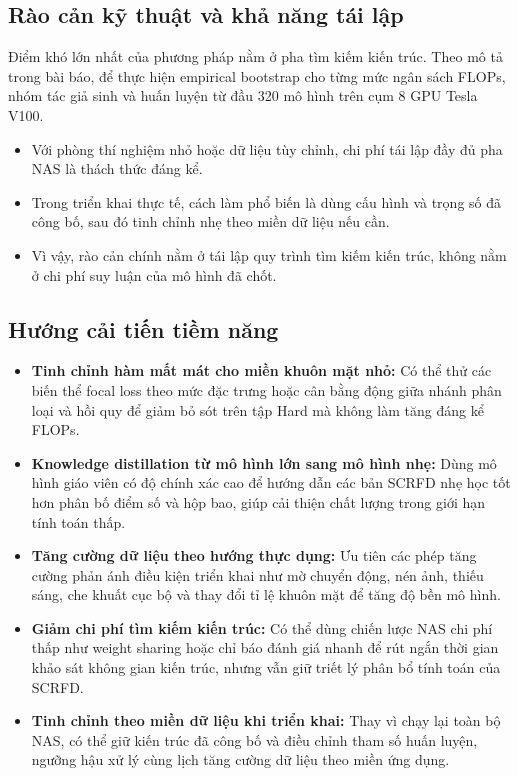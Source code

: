 \subsection{Rào cản kỹ thuật và khả năng tái lập}

Điểm khó lớn nhất của phương pháp nằm ở pha tìm kiếm kiến trúc.
Theo mô tả trong bài báo, để thực hiện empirical bootstrap cho từng mức ngân sách FLOPs, nhóm tác giả sinh và huấn luyện từ đầu 320 mô hình trên cụm 8 GPU Tesla V100.  \cite{guo2022scrfd}
\begin{itemize}
  \item Với phòng thí nghiệm nhỏ hoặc dữ liệu tùy chỉnh, chi phí tái lập đầy đủ pha NAS là thách thức đáng kể.
  \item Trong triển khai thực tế, cách làm phổ biến là dùng cấu hình và trọng số đã công bố, sau đó tinh chỉnh nhẹ theo miền dữ liệu nếu cần.
  \item Vì vậy, rào cản chính nằm ở tái lập quy trình tìm kiếm kiến trúc, không nằm ở chi phí suy luận của mô hình đã chốt.
\end{itemize}

\subsection{Hướng cải tiến tiềm năng}
\begin{itemize}
  \item \textbf{Tinh chỉnh hàm mất mát cho miền khuôn mặt nhỏ:}
  Có thể thử các biến thể focal loss theo mức đặc trưng hoặc cân bằng động giữa nhánh phân loại và hồi quy để giảm bỏ sót trên tập Hard mà không làm tăng đáng kể FLOPs.
  \item \textbf{Knowledge distillation từ mô hình lớn sang mô hình nhẹ:}
  Dùng mô hình giáo viên có độ chính xác cao để hướng dẫn các bản SCRFD nhẹ học tốt hơn phân bố điểm số và hộp bao, giúp cải thiện chất lượng trong giới hạn tính toán thấp.
  \item \textbf{Tăng cường dữ liệu theo hướng thực dụng:}
  Ưu tiên các phép tăng cường phản ánh điều kiện triển khai như mờ chuyển động, nén ảnh, thiếu sáng, che khuất cục bộ và thay đổi tỉ lệ khuôn mặt để tăng độ bền mô hình.
  \item \textbf{Giảm chi phí tìm kiếm kiến trúc:}
  Có thể dùng chiến lược NAS chi phí thấp như weight sharing hoặc chỉ báo đánh giá nhanh để rút ngắn thời gian khảo sát không gian kiến trúc, nhưng vẫn giữ triết lý phân bổ tính toán của SCRFD. \cite{mellor2021neural}
  \item \textbf{Tinh chỉnh theo miền dữ liệu khi triển khai:}
  Thay vì chạy lại toàn bộ NAS, có thể giữ kiến trúc đã công bố và điều chỉnh tham số huấn luyện, ngưỡng hậu xử lý cùng lịch tăng cường dữ liệu theo miền ứng dụng.
\end{itemize}
